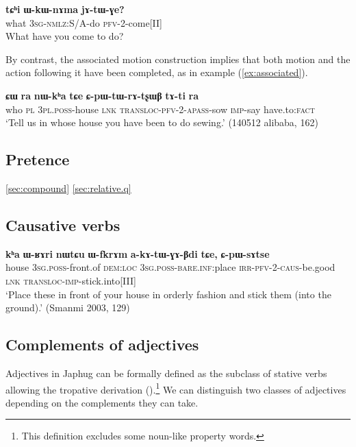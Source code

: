 \documentclass[oneside,a4paper,11pt]{article}
\newcommand{\ipa}[1]{\textbf{\phon#1}} %
\newcommand{\refb}[1]{(\ref{#1})}
\begin{document}
\begin{exe}
\ex \label{ex:motion.verb}
\gll
\ipa{tɕʰi} 	\ipa{ɯ-kɯ-nɤma} 	\ipa{jɤ-tɯ-ɣe?} \\
what \textsc{3sg-nmlz:}S/A-do \textsc{pfv-2}-come[II] \\
\glt What have you come to do?
\end{exe} 

By contrast, the associated motion construction implies that both motion and the action following it have been completed, as in example \refb{ex:associated}.

\begin{exe}
\ex \label{ex:associated}
\gll
\ipa{ɕɯ} 	\ipa{ra} 	\ipa{nɯ-kʰa} 	\ipa{tɕe} 	\ipa{ɕ-pɯ-tɯ-rɤ-tʂɯβ} \ipa{tɤ-ti} \ipa{ra}\\
who \textsc{pl} \textsc{3pl.poss}-house \textsc{lnk} \textsc{transloc-pfv-2-apass}-sow \textsc{imp}-say  have.to:\textsc{fact} \\
\glt `Tell us in whose house you have been to do sewing.' (140512 alibaba, 162)
 \end{exe} 

\subsection{Pretence} \label{sec:pretence}
\ref{sec:compound} \ref{sec:relative.q}
  
\subsection{Causative verbs}


  \begin{exe}
\ex 
\gll \ipa{kʰa} 	\ipa{ɯ-ʁɤri} 	\ipa{nɯtɕu} 	\ipa{ɯ-fkrɤm} 	\ipa{a-kɤ-tɯ-ɣɤ-βdi} 	\ipa{tɕe,} 	\ipa{ɕ-pɯ-sɤtse} \\
house \textsc{3sg.poss}-front.of \textsc{dem:loc} \textsc{3sg.poss-bare.inf}:place \textsc{irr-pfv-2-caus}-be.good \textsc{lnk} \textsc{transloc-imp}-stick.into[III] \\
\glt `Place these in front of your house in orderly fashion and stick them (into the ground).' (Smanmi 2003, 129)
  \end{exe}
  
\subsection{Complements of adjectives} \label{sec:adj}
Adjectives in Japhug can be formally defined as the subclass of stative verbs allowing the tropative derivation (\citealt{jacques13tropative}).\footnote{This definition excludes some noun-like property words.} We can distinguish two classes of adjectives depending on the complements they can take.
\end{document}
